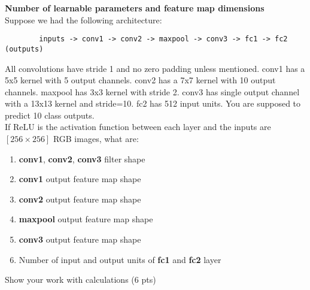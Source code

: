 \textbf{Number of learnable parameters and feature map dimensions} \\
Suppose we had the following architecture:
\begin{verbatim}
        inputs -> conv1 -> conv2 -> maxpool -> conv3 -> fc1 -> fc2 (outputs)
    \end{verbatim}
All convolutions have stride 1 and no zero padding unless mentioned. conv1 has a 5x5 kernel with 5 output channels. conv2 has a 7x7 kernel with 10 output channels. maxpool has 3x3 kernel with stride 2. conv3 has single output channel with a 13x13 kernel and stride=10. fc2 has 512 input units. You are supposed to predict 10 class outputs.\\
If ReLU is the activation function between each layer and the inputs are $[256 \times 256]$ RGB images, what are:
\begin{enumerate}
	\item \textbf{conv1}, \textbf{conv2}, \textbf{conv3} filter shape
	\item \textbf{conv1} output feature map shape
	\item \textbf{conv2} output feature map shape
	\item \textbf{maxpool} output feature map shape
	\item \textbf{conv3} output feature map shape
	\item Number of input and output units of \textbf{fc1} and \textbf{fc2} layer
\end{enumerate}
Show your work with calculations (6 pts)

